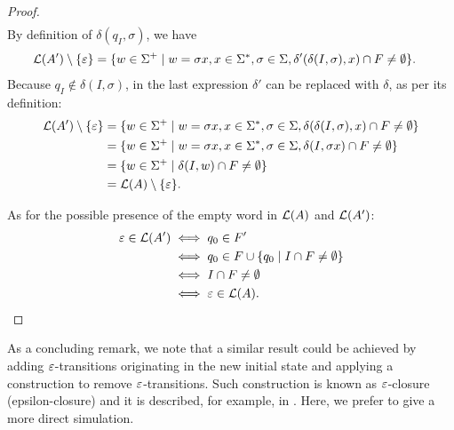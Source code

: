 \begin{proof}
\begin{align*}
	\end{align*}
	By definition of $\delta(q_I,\sigma)$, we have
	\begin{align*}
		\mathcal L(A')\setminus\{\varepsilon\} & = \{w\in\Sigma^+\mid w=\sigma x, x\in\Sigma^*,\sigma\in\Sigma,\delta'(\delta(I,\sigma),x)\cap F\ne\emptyset\} \text.
	\end{align*}
	Because $q_I\notin\delta(I,\sigma)$, in the last expression $\delta'$ can be replaced with $\delta$, as per its definition:
	\begin{align*}
		\mathcal L(A')\setminus\{\varepsilon\} & = \{w\in\Sigma^+\mid w=\sigma x, x\in\Sigma^*,\sigma\in\Sigma,\delta(\delta(I,\sigma),x)\cap F\ne\emptyset\} \\
		                                      & = \{w\in\Sigma^+\mid w=\sigma x, x\in\Sigma^*,\sigma\in\Sigma,\delta(I,\sigma x)\cap F\ne\emptyset\}         \\
		                                      & = \{w\in\Sigma^+\mid \delta(I,w)\cap F\ne\emptyset\}                                                            \\
		                                      & = \mathcal L(A)\setminus\{\varepsilon\} \text.
	\end{align*}

	As for the possible presence of the empty word in $\mathcal L(A)$ and $\mathcal L(A')$:
	\begin{align*}
		\varepsilon\in\mathcal L(A') & \iff q_0\in F'                                     \\
		                          & \iff q_0\in F\cup\{q_0\mid I\cap F\ne\emptyset\} \\
		                          & \iff I\cap F\ne\emptyset                           \\
		                          & \iff \varepsilon\in\mathcal L(A) \text. \qedhere
	\end{align*}
\end{proof}
As a concluding remark, we note that a similar result could be achieved by adding $\varepsilon$-transitions originating in the new initial state and applying a construction to remove $\varepsilon$-transitions.
Such construction is known as $\varepsilon$-closure (epsilon-closure) and it is described, for example, in \cite[Theorem 2.2]{HopUll79}.
Here, we prefer to give a more direct simulation.


